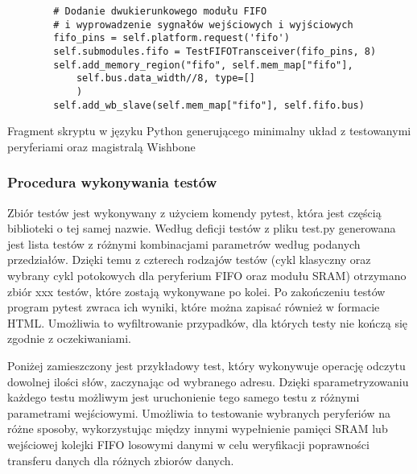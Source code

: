\begin{longlisting}
\begin{verbatim}
        # Dodanie dwukierunkowego modułu FIFO
        # i wyprowadzenie sygnałów wejściowych i wyjściowych
        fifo_pins = self.platform.request('fifo')
        self.submodules.fifo = TestFIFOTransceiver(fifo_pins, 8)
        self.add_memory_region("fifo", self.mem_map["fifo"],
            self.bus.data_width//8, type=[]
            )
        self.add_wb_slave(self.mem_map["fifo"], self.fifo.bus)
\end{verbatim}
\caption{\label{lst:harness-basesoc}Fragment skryptu w języku Python generującego minimalny układ z testowanymi peryferiami oraz magistralą Wishbone}
\end{longlisting}

\subsubsection{Procedura wykonywania testów}
Zbiór testów jest wykonywany z użyciem komendy pytest, która jest częścią biblioteki o tej samej nazwie. Według deficji testów z pliku test.py generowana jest lista testów z różnymi kombinacjami parametrów według podanych przedziałów. Dzięki temu z czterech rodzajów testów (cykl klasyczny oraz wybrany cykl potokowych dla peryferium FIFO oraz modułu SRAM) otrzymano zbiór xxx testów, które zostają wykonywane po kolei. Po zakończeniu testów program pytest zwraca ich wyniki, które można zapisać również w formacie HTML. Umożliwia to wyfiltrowanie przypadków, dla których testy nie kończą się zgodnie z oczekiwaniami.

Poniżej zamieszczony jest przykładowy test, który wykonywuje operację odczytu dowolnej ilości słów, zaczynając od wybranego adresu. Dzięki sparametryzowaniu każdego testu możliwym jest uruchonienie tego samego testu z różnymi parametrami wejściowymi. Umożliwia to testowanie wybranych peryferiów na różne sposoby, wykorzystując między innymi wypełnienie pamięci SRAM lub wejściowej kolejki FIFO losowymi danymi w celu weryfikacji poprawności transferu danych dla różnych zbiorów danych.

